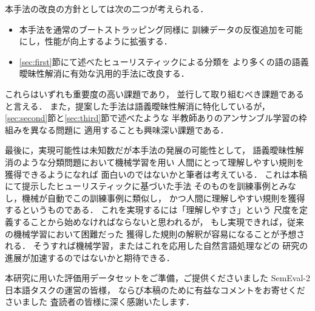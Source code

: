 \documentclass[japanese]{jnlp_1.4}
\begin{document}
本手法の改良の方針としては次の二つが考えられる．
\begin{itemize}
\item 本手法を通常のブートストラッピング同様に
訓練データの反復追加を可能にし，性能が向上するように拡張する．
\item \ref{sec:first}節にて述べたヒューリスティックによる分類を
より多くの語の語義曖昧性解消に有効な汎用的手法に改良する．
\end{itemize}
これらはいずれも重要度の高い課題であり，
並行して取り組むべき課題であると言える．
また，提案した手法は語義曖昧性解消に特化しているが，
\ref{sec:second}節と\ref{sec:third}節で述べたような
半教師ありのアンサンブル学習の枠組みを異なる問題に
適用することも興味深い課題である．

最後に，実現可能性は未知数だが本手法の発展の可能性として，
語義曖昧性解消のような分類問題において機械学習を用い
人間にとって理解しやすい規則を獲得できるようになれば
面白いのではないかと筆者は考えている．
これは本稿にて提示したヒューリスティックに基づいた手法
そのものを訓練事例とみなし，機械が自動でこの訓練事例に類似し，
かつ人間に理解しやすい規則を獲得するというものである．
これを実現するには「理解しやすさ」という
尺度を定義することから始めなければならないと思われるが，
もし実現できれば，従来の機械学習において困難だった
獲得した規則の解釈が容易になることが予想される．
そうすれば機械学習，またはこれを応用した自然言語処理などの
研究の進展が加速するのではないかと期待できる．




\acknowledgment

本研究に用いた評価用データセットをご準備，ご提供くださいました
SemEval-2日本語タスクの運営の皆様，
ならび本稿のために有益なコメントをお寄せくださいました
査読者の皆様に深く感謝いたします．
\end{document}

